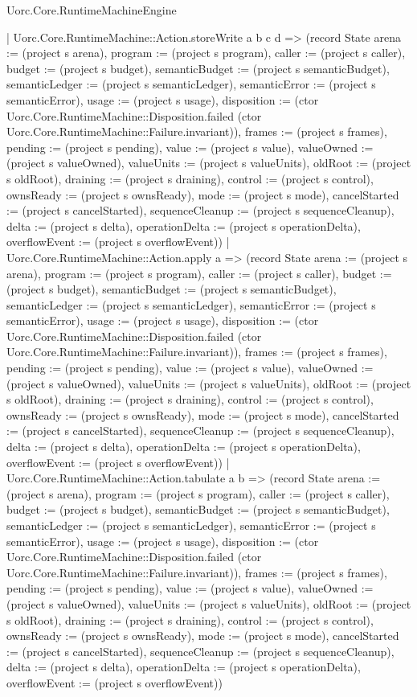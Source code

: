 \begin{lexlean}{Uorc.Core.RuntimeMachineEngine}
\begin{semanticmodule}
{      | Uorc.Core.RuntimeMachine::Action.storeWrite a b c d => (record State {arena := (project s arena), program := (project s program), caller := (project s caller), budget := (project s budget), semanticBudget := (project s semanticBudget), semanticLedger := (project s semanticLedger), semanticError := (project s semanticError), usage := (project s usage), disposition := (ctor Uorc.Core.RuntimeMachine::Disposition.failed (ctor Uorc.Core.RuntimeMachine::Failure.invariant)), frames := (project s frames), pending := (project s pending), value := (project s value), valueOwned := (project s valueOwned), valueUnits := (project s valueUnits), oldRoot := (project s oldRoot), draining := (project s draining), control := (project s control), ownsReady := (project s ownsReady), mode := (project s mode), cancelStarted := (project s cancelStarted), sequenceCleanup := (project s sequenceCleanup), delta := (project s delta), operationDelta := (project s operationDelta), overflowEvent := (project s overflowEvent)})
      | Uorc.Core.RuntimeMachine::Action.apply a => (record State {arena := (project s arena), program := (project s program), caller := (project s caller), budget := (project s budget), semanticBudget := (project s semanticBudget), semanticLedger := (project s semanticLedger), semanticError := (project s semanticError), usage := (project s usage), disposition := (ctor Uorc.Core.RuntimeMachine::Disposition.failed (ctor Uorc.Core.RuntimeMachine::Failure.invariant)), frames := (project s frames), pending := (project s pending), value := (project s value), valueOwned := (project s valueOwned), valueUnits := (project s valueUnits), oldRoot := (project s oldRoot), draining := (project s draining), control := (project s control), ownsReady := (project s ownsReady), mode := (project s mode), cancelStarted := (project s cancelStarted), sequenceCleanup := (project s sequenceCleanup), delta := (project s delta), operationDelta := (project s operationDelta), overflowEvent := (project s overflowEvent)})
      | Uorc.Core.RuntimeMachine::Action.tabulate a b => (record State {arena := (project s arena), program := (project s program), caller := (project s caller), budget := (project s budget), semanticBudget := (project s semanticBudget), semanticLedger := (project s semanticLedger), semanticError := (project s semanticError), usage := (project s usage), disposition := (ctor Uorc.Core.RuntimeMachine::Disposition.failed (ctor Uorc.Core.RuntimeMachine::Failure.invariant)), frames := (project s frames), pending := (project s pending), value := (project s value), valueOwned := (project s valueOwned), valueUnits := (project s valueUnits), oldRoot := (project s oldRoot), draining := (project s draining), control := (project s control), ownsReady := (project s ownsReady), mode := (project s mode), cancelStarted := (project s cancelStarted), sequenceCleanup := (project s sequenceCleanup), delta := (project s delta), operationDelta := (project s operationDelta), overflowEvent := (project s overflowEvent)})
}
\end{semanticmodule}
\end{lexlean}
